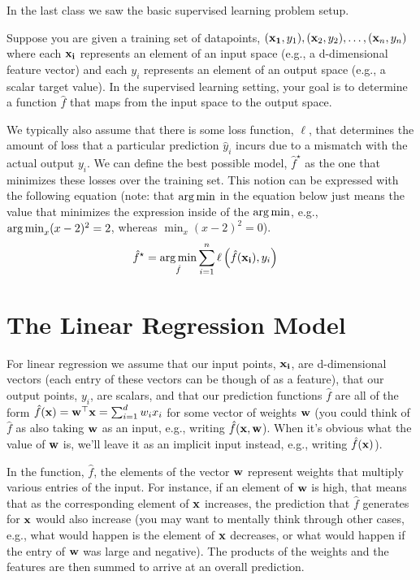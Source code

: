 \documentclass{tufte-handout}
\begin{document}
\begin{recall}
In the last class we saw the basic supervised learning problem setup.

Suppose you are given a training set of datapoints, $(\mathbf{x_1}, y_1), (\mathbf{x}_2, y_2), \ldots, (\mathbf{x}_n, y_n)$ where each $\mathbf{x_i}$ represents an element of an input space (e.g., a d-dimensional feature vector) and each $y_i$ represents an element of an output space (e.g., a scalar target value).  In the supervised learning setting, your goal is to determine a function $\hat{f}$ that maps from the input space to the output space.

We typically also assume that there is some loss function, $\ell$, that determines the amount of loss that a particular prediction $\hat{y}_i$ incurs due to a mismatch with the actual output $y_i$.  We can define the best possible model, $\hat{f}^\star$ as the one that minimizes these losses over the training set.  This notion can be expressed with the following equation  (note: that $\operatorname*{arg\,min}$ in the equation below just means the value that minimizes the expression inside of the $\operatorname*{arg\,min}$, e.g., $\operatorname*{arg\,min}_{x} (x - 2)^2 = 2$, whereas $\min_{x} (x-2)^2 = 0$).
\begin{align}
\hat{f}^\star &= \operatorname*{arg\,min}_{\hat{f}} \sum_{i=1}^n \ell \left ( \hat{f}(\mathbf{x_i}), y_i \right )
\end{align} 

\end{recall}

\section{The Linear Regression Model}

For linear regression we assume that our input points, $\mathbf{x_i}$, are d-dimensional vectors (each entry of these vectors can be though of as a feature), that our output points, $y_i$, are scalars, and that our prediction functions $\hat{f}$ are all of the form $\hat{f}(\mathbf{x}) = \mathbf{w}^\top \mathbf{x} = \sum_{i=1}^d w_i x_i$ for some vector of weights $\mathbf{w}$ (you could think of $\hat{f}$ as also taking $\mathbf{w}$ as an input, e.g., writing $\hat{f}(\mathbf{x}, \mathbf{w}$).  When it's obvious what the value of $\mathbf{w}$ is, we'll leave it as an implicit input instead, e.g., writing $\hat{f}(\mathbf{x})$).

In the function, $\hat{f}$, the elements of the vector $\mathbf{w}$ represent weights that multiply various entries of the input.  For instance, if an element of $\mathbf{w}$ is high, that means that as the corresponding element of $\mathbf{x}$ increases, the prediction that $\hat{f}$ generates for $\mathbf{x}$ would also increase (you may want to mentally think through other cases, e.g., what would happen is the element of $\mathbf{x}$ decreases, or what would happen if the entry of $\mathbf{w}$ was large and negative).  The products of the weights and the features are then summed to arrive at an overall prediction.
\end{document}
